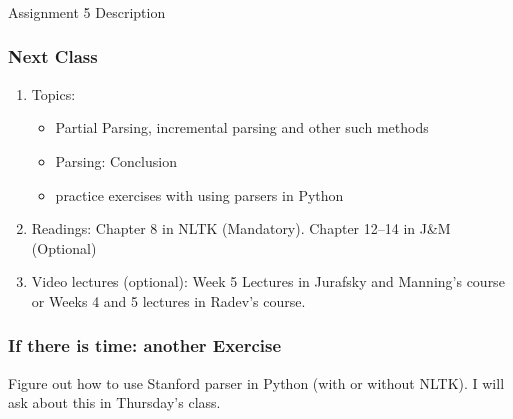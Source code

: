 \documentclass{beamer}
\begin{document}
\begin{frame}
\frametitle{}
\Large Assignment 5 Description
\end{frame}

\begin{frame}
\frametitle{Next Class}
\begin{enumerate}
\item Topics: 
\begin{itemize}
\item Partial Parsing, incremental parsing and other such methods
\item Parsing: Conclusion
\item practice exercises with using parsers in Python
\end{itemize}
\item Readings: Chapter 8 in NLTK (Mandatory). Chapter 12--14 in J\&M (Optional)
\item Video lectures (optional): Week 5 Lectures in Jurafsky and Manning's course or Weeks 4 and 5 lectures in Radev's course.
\end{enumerate}
\end{frame}

\begin{frame}
\frametitle{If there is time: another Exercise}
Figure out how to use Stanford parser in Python (with or without NLTK). I will ask about this in Thursday's class. 
\end{frame}
\end{document}
